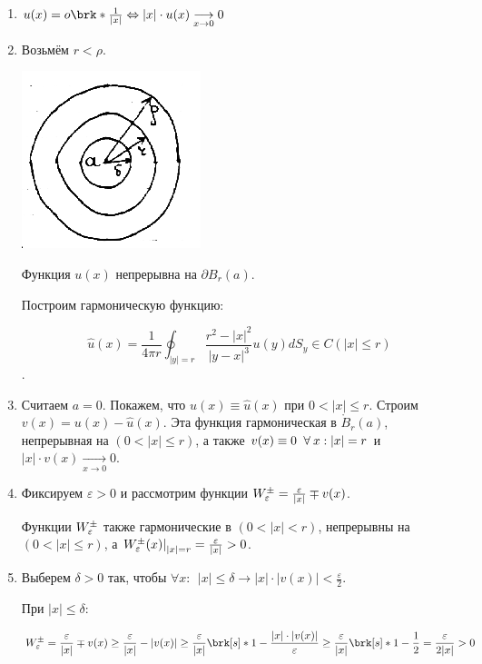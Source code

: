 \begin{enumerate}
\item{ 
	
	$u(x) = o \brk*{\frac{1}{|x|}} \Leftrightarrow |x| \cdot u(x) 
	\underset{x \to 0}{\longrightarrow} 0$
}

\item{
Возьмём $r<\rho$. 
\begin{center}
\includegraphics{22_1_new}
\end{center}
Функция $u(x)$ непрерывна на $\partial B_r (a)$.

Построим гармоническую функцию:

$$\hat{u}(x) = \frac{1}{4 \pi r} 
\oint_{|y|=r}\frac{r^2 - |x|^2}{|y-x|^3} u(y) dS_y \in 
C(|x| \le r)$$.

}


\item{

Считаем $a=0$. Покажем, что $u(x) \equiv \hat{u}(x)$ при $0<|x|\le r$. Строим $v(x) = u(x) - \hat{u}(x)$. Эта функция гармоническая в $\mathring{B}_r(a)$, непрерывная на $(0<|x| \le r)$, а также 
$v(x) \equiv 0 \;\;\forall\: x: |x|=r$ и $|x| \cdot v(x) \underset{x \to 0}{\longrightarrow} 0$. 
 
}

\item{

Фиксируем $\varepsilon >0$ и рассмотрим функции $W_\varepsilon^{\pm} =
\frac{\varepsilon}{|x|} \mp v(x)$.

Функции $W_\varepsilon^{\pm}$ также гармонические в $(0<|x|<r)$, непрерывны на $(0<|x| \le r)$, а 
$\left.W_\varepsilon^{\pm}(x) \right|_{|x|=r} =\frac{\varepsilon}{|x|} >0$.
}

\item{

Выберем $\delta > 0 $ так, чтобы $\forall x:~~ |x| \le \delta \to |x| \cdot |v(x)| < \frac{\varepsilon}{2}$.

При $|x|\le \delta$: 

$$
W_\varepsilon^{\pm} = \frac{\eps}{|x|} \mp v(x) \ge 
\frac{\eps}{|x|} - |v(x)|
\ge 
\frac{\eps}{|x|}\brk[s]*{1 - \frac{|x|\cdot |v(x)|}{\varepsilon}}
\ge
\frac{\eps}{|x|}\brk[s]*{1-\frac{1}{2}}
=
\frac{\varepsilon}{2|x|} >0
$$
}




\end{enumerate}
